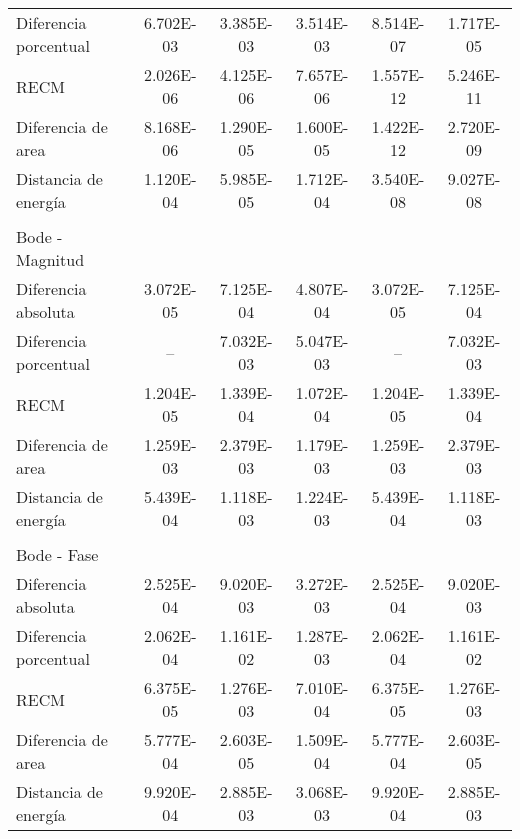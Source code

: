 {\begin{longtable}{l @{\extracolsep{\fill}} ccccc}
            Diferencia porcentual  & \num{6.702E-03} & \num{3.385E-03} & \num{3.514E-03} & \num{8.514E-07} & \num{1.717E-05}  \\
            RECM                   & \num{2.026E-06} & \num{4.125E-06} & \num{7.657E-06} & \num{1.557E-12} & \num{5.246E-11}  \\
            Diferencia de area     & \num{8.168E-06} & \num{1.290E-05} & \num{1.600E-05} & \num{1.422E-12} & \num{2.720E-09}  \\
            Distancia de energía   & \num{1.120E-04} & \num{5.985E-05} & \num{1.712E-04} & \num{3.540E-08} & \num{9.027E-08}  \\
            & & & & & \\
            Bode - Magnitud        &  &  &  &  & \\ \cmidrule{1-1}
            Diferencia absoluta    & \num{3.072E-05} & \num{7.125E-04} & \num{4.807E-04} & \num{3.072E-05} & \num{7.125E-04}  \\
            Diferencia porcentual  &        --       & \num{7.032E-03} & \num{5.047E-03} &        --       & \num{7.032E-03}  \\
            RECM                   & \num{1.204E-05} & \num{1.339E-04} & \num{1.072E-04} & \num{1.204E-05} & \num{1.339E-04}  \\
            Diferencia de area     & \num{1.259E-03} & \num{2.379E-03} & \num{1.179E-03} & \num{1.259E-03} & \num{2.379E-03}  \\
            Distancia de energía   & \num{5.439E-04} & \num{1.118E-03} & \num{1.224E-03} & \num{5.439E-04} & \num{1.118E-03}  \\
            & & & & & \\
            Bode - Fase            &  &  &  &  & \\ \cmidrule{1-1}
            Diferencia absoluta    & \num{2.525E-04} & \num{9.020E-03} & \num{3.272E-03} & \num{2.525E-04} & \num{9.020E-03}  \\
            Diferencia porcentual  & \num{2.062E-04} & \num{1.161E-02} & \num{1.287E-03} & \num{2.062E-04} & \num{1.161E-02}  \\
            RECM                   & \num{6.375E-05} & \num{1.276E-03} & \num{7.010E-04} & \num{6.375E-05} & \num{1.276E-03}  \\
            Diferencia de area     & \num{5.777E-04} & \num{2.603E-05} & \num{1.509E-04} & \num{5.777E-04} & \num{2.603E-05}  \\
            Distancia de energía   & \num{9.920E-04} & \num{2.885E-03} & \num{3.068E-03} & \num{9.920E-04} & \num{2.885E-03}  \\

\end{longtable}}
